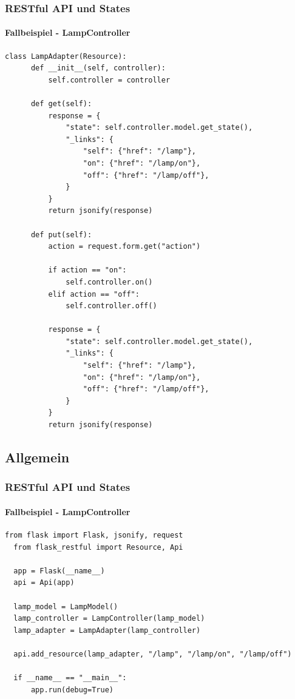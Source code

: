 \begin{frame}[fragile]
  \frametitle{RESTful API und States}
  \framesubtitle{Fallbeispiel - LampController}
    \begin{minipage}{\textwidth}
  \begin{lstlisting}[basicstyle=\tiny, caption={LampController},captionpos=b,label={lst:lamp_c}]
  class LampAdapter(Resource):
      def __init__(self, controller):
          self.controller = controller

      def get(self):
          response = {
              "state": self.controller.model.get_state(),
              "_links": {
                  "self": {"href": "/lamp"},
                  "on": {"href": "/lamp/on"},
                  "off": {"href": "/lamp/off"},
              }
          }
          return jsonify(response)

      def put(self):
          action = request.form.get("action")

          if action == "on":
              self.controller.on()
          elif action == "off":
              self.controller.off()

          response = {
              "state": self.controller.model.get_state(),
              "_links": {
                  "self": {"href": "/lamp"},
                  "on": {"href": "/lamp/on"},
                  "off": {"href": "/lamp/off"},
              }
          }
          return jsonify(response)
  \end{lstlisting}
  \end{minipage}
\end{frame}
\subsection{Allgemein}
\begin{frame}[fragile]
  \frametitle{RESTful API und States}
  \framesubtitle{Fallbeispiel - LampController}
  \begin{minipage}{\textwidth}
  \begin{lstlisting}[caption={Lamp REST APP},captionpos=b,label={lst:lamp_r}]
  from flask import Flask, jsonify, request
  from flask_restful import Resource, Api

  app = Flask(__name__)
  api = Api(app)

  lamp_model = LampModel()
  lamp_controller = LampController(lamp_model)
  lamp_adapter = LampAdapter(lamp_controller)

  api.add_resource(lamp_adapter, "/lamp", "/lamp/on", "/lamp/off")

  if __name__ == "__main__":
      app.run(debug=True)
  \end{lstlisting}
\end{minipage}
\end{frame}  




